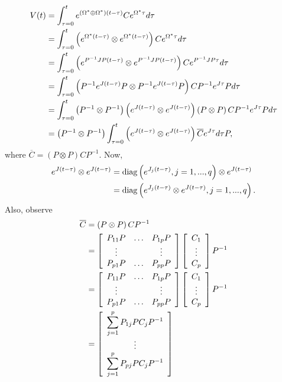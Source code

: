 \documentclass{article}
\begin{document}
\newpage 
\begin{align}
    V(t)&=\int_{\tau=0}^t \Exp{(\Omega\tr \oplus \Omega\tr)(t-\tau)} C \Exp{\Omega\tr \tau} d \tau 
    \\&=\int_{\tau=0}^t \left(\Exp{\Omega\tr (t-\tau)} \otimes \Exp{\Omega\tr(t-\tau)}\right) C \Exp{\Omega\tr \tau} d \tau 
    \\&=\int_{\tau=0}^t \left(\Exp{P^{-1}JP (t-\tau)} \otimes \Exp{P^{-1}JP(t-\tau)}\right) C \Exp{P^{-1}JP \tau} d \tau 
    \\&=\int_{\tau=0}^t \left(P^{-1}\Exp{J (t-\tau)}P \otimes P^{-1}\Exp{J(t-\tau)}P\right) C P^{-1}\Exp{J \tau} P d \tau 
    \\&=\int_{\tau=0}^t \left(P^{-1} \otimes P^{-1}\right) \left(\Exp{J (t-\tau)}\otimes \Exp{J(t-\tau)}\right) \left(P \otimes P\right) C P^{-1}\Exp{J \tau} P d \tau 
    \\&=\left(P^{-1} \otimes P^{-1}\right) \int_{\tau=0}^t \left(\Exp{J (t-\tau)}\otimes \Exp{J(t-\tau)}\right) \overline C \Exp{J \tau} d \tau P,
\end{align}
where \(\overline C = \left(P \otimes P\right) C P^{-1}\). Now, 
\begin{align}
    \Exp{J (t-\tau)}\otimes \Exp{J(t-\tau)}
    &= \diag{\Exp{J_j (t-\tau)},j=1,...,q}\otimes \Exp{J(t-\tau)}
    \\&= \diag{\Exp{J_j (t-\tau)}\otimes \Exp{J(t-\tau)},j=1,...,q}.
\end{align}
Also, observe 
\begin{align}
    \overline C &= \left(P \otimes P\right) C P^{-1}
    \\&= \Matrix{ccc}{P_{11}P & \hdots & P_{1p}P \\ \vdots & & \vdots \\ P_{p1}P & \hdots & P_{pp}P} \Matrix{c}{C_1 \\ \vdots \\ C_p} P^{-1}
    \\&= \Matrix{ccc}{P_{11}P & \hdots & P_{1p}P \\ \vdots & & \vdots \\ P_{p1}P & \hdots & P_{pp}P} \Matrix{c}{C_1 \\ \vdots \\ C_p} P^{-1}
    \\&= \Matrix{c}{\displaystyle \sum_{j=1}^p P_{1j} P C_j P^{-1} \\ \vdots \\ \displaystyle \sum_{j=1}^p P_{pj} P C_j P^{-1}}
\end{align}
\end{document}
